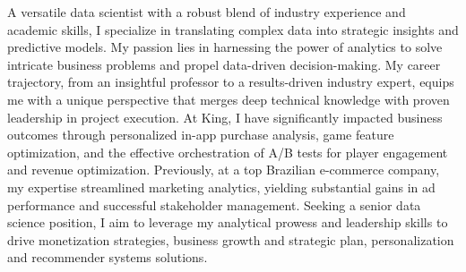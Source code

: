 

A versatile data scientist with a robust blend of industry experience and academic skills, 
I specialize in translating complex data into strategic insights and predictive models. 
My passion lies in harnessing the power of analytics to solve intricate business problems and propel data-driven decision-making.
My career trajectory, from an insightful professor to a results-driven industry expert, 
equips me with a unique perspective that merges deep technical knowledge with proven leadership in project execution.
At King, I have significantly impacted business outcomes through personalized in-app purchase analysis, 
game feature optimization, and the effective orchestration of A/B tests for player engagement and revenue optimization.
Previously, at a top Brazilian e-commerce company, my expertise streamlined marketing analytics, 
yielding substantial gains in ad performance and successful stakeholder management.
Seeking a senior data science position, I aim to leverage my analytical prowess and leadership skills to 
drive monetization strategies, business growth and strategic plan, personalization and recommender systems solutions. 
